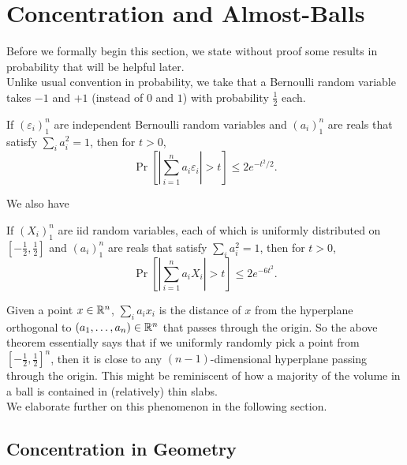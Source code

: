 \section{Concentration and Almost-Balls}

Before we formally begin this section, we state without proof some results in probability that will be helpful later.\\

Unlike usual convention in probability, we take that a Bernoulli random variable takes $-1$ and $+1$ (instead of $0$ and $1$) with probability $\frac{1}{2}$ each.

\begin{ftheo}
\label{hoeffding's inequality}
If $(\varepsilon_i)_1^n$ are independent Bernoulli random variables and $(a_i)_1^n$ are reals that satisfy $\sum_i a_i^2 = 1$, then for $t>0$,
\[ \Pr\left[\left|\sum_{i=1}^n a_i\varepsilon_i\right| > t\right] \leq 2e^{-t^2/2}. \]
\end{ftheo}

We also have

\begin{theorem}
If $(X_i)_1^n$ are iid random variables, each of which is uniformly distributed on $[-\frac{1}{2},\frac{1}{2}]$ and $(a_i)_1^n$ are reals that satisfy $\sum_i a_i^2 = 1$, then for $t>0$,
\[ \Pr\left[\left|\sum_{i=1}^n a_i X_i\right| > t\right] \leq 2e^{-6t^2}. \]
\end{theorem}

Given a point $x\in\mathbb{R}^n$, $\sum_i a_i x_i$ is the distance of $x$ from the hyperplane orthogonal to $(a_1,\ldots,a_n)\in\mathbb{R}^n$ that passes through the origin. So the above theorem essentially says that if we uniformly randomly pick a point from $\left[-\frac{1}{2},\frac{1}{2}\right]^n$, then it is close to any $(n-1)$-dimensional hyperplane passing through the origin. This might be reminiscent of how a majority of the volume in a ball is contained in (relatively) thin slabs.\\
We elaborate further on this phenomenon in the following section.

\subsection{Concentration in Geometry}

